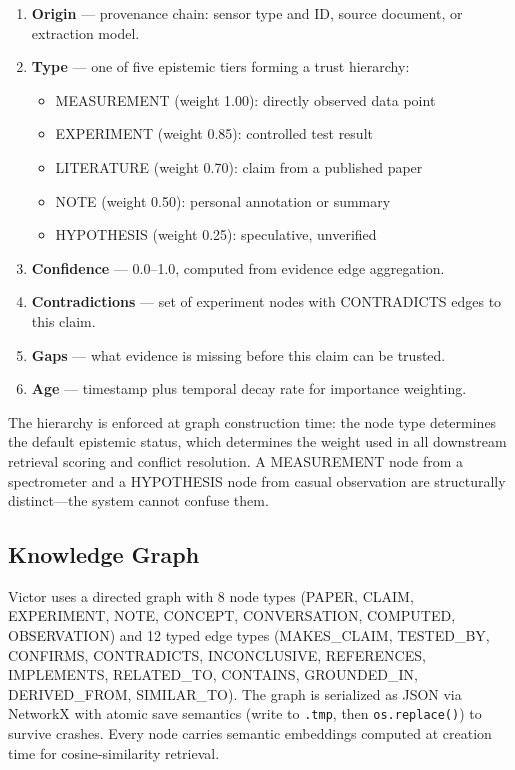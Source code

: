 \documentclass[letterpaper]{article}          %
\theoremstyle{plain}
\theoremstyle{definition}
\theoremstyle{remark}
\begin{document}
\begin{enumerate}
    \item \textbf{Origin} --- provenance chain: sensor type and ID, source
    document, or extraction model.
    \item \textbf{Type} --- one of five epistemic tiers forming a trust hierarchy:
    \begin{itemize}
        \item MEASUREMENT (weight 1.00): directly observed data point
        \item EXPERIMENT (weight 0.85): controlled test result
        \item LITERATURE (weight 0.70): claim from a published paper
        \item NOTE (weight 0.50): personal annotation or summary
        \item HYPOTHESIS (weight 0.25): speculative, unverified
    \end{itemize}
    \item \textbf{Confidence} --- 0.0--1.0, computed from evidence edge aggregation.
    \item \textbf{Contradictions} --- set of experiment nodes with CONTRADICTS
    edges to this claim.
    \item \textbf{Gaps} --- what evidence is missing before this claim can be
    trusted.
    \item \textbf{Age} --- timestamp plus temporal decay rate for importance
    weighting.
\end{enumerate}

The hierarchy is enforced at graph construction time: the node type determines
the default epistemic status, which determines the weight used in all downstream
retrieval scoring and conflict resolution. A MEASUREMENT node from a spectrometer
and a HYPOTHESIS node from casual observation are structurally distinct---the
system cannot confuse them.

\subsection{Knowledge Graph}

Victor uses a directed graph with 8 node types (PAPER, CLAIM, EXPERIMENT, NOTE,
CONCEPT, CONVERSATION, COMPUTED, OBSERVATION) and 12 typed edge types (MAKES\_CLAIM,
TESTED\_BY, CONFIRMS, CONTRADICTS, INCONCLUSIVE, REFERENCES, IMPLEMENTS,
RELATED\_TO, CONTAINS, GROUNDED\_IN, DERIVED\_FROM, SIMILAR\_TO). The graph is
serialized as JSON via NetworkX with atomic save semantics (write to \texttt{.tmp},
then \texttt{os.replace()}) to survive crashes. Every node carries semantic
embeddings computed at creation time for cosine-similarity retrieval.
\end{document}

